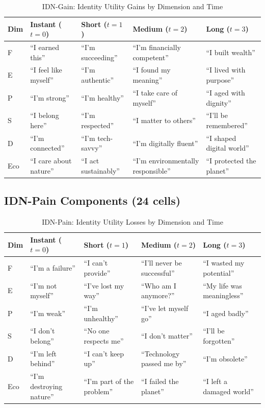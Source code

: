 \begin{table}[htbp]
\centering
\caption{IDN-Gain: Identity Utility Gains by Dimension and Time}
\label{tab:app-c-idn-gain}
\small
\renewcommand{\arraystretch}{1.2}
\begin{tabular}{@{}lp{2.8cm}p{2.8cm}p{2.8cm}p{2.8cm}@{}}
\toprule
\textbf{Dim} & \textbf{Instant ($t=0$)} & \textbf{Short ($t=1$)} & \textbf{Medium ($t=2$)} & \textbf{Long ($t=3$)} \\
\midrule
F & ``I earned this'' & ``I'm succeeding'' & ``I'm financially competent'' & ``I built wealth'' \\
E & ``I feel like myself'' & ``I'm authentic'' & ``I found my meaning'' & ``I lived with purpose'' \\
P & ``I'm strong'' & ``I'm healthy'' & ``I take care of myself'' & ``I aged with dignity'' \\
S & ``I belong here'' & ``I'm respected'' & ``I matter to others'' & ``I'll be remembered'' \\
D & ``I'm connected'' & ``I'm tech-savvy'' & ``I'm digitally fluent'' & ``I shaped digital world'' \\
Eco & ``I care about nature'' & ``I act sustainably'' & ``I'm environmentally responsible'' & ``I protected the planet'' \\
\bottomrule
\end{tabular}
\end{table}

\subsection{IDN-Pain Components (24 cells)}

\begin{table}[htbp]
\centering
\caption{IDN-Pain: Identity Utility Losses by Dimension and Time}
\label{tab:app-c-idn-pain}
\small
\renewcommand{\arraystretch}{1.2}
\begin{tabular}{@{}lp{2.8cm}p{2.8cm}p{2.8cm}p{2.8cm}@{}}
\toprule
\textbf{Dim} & \textbf{Instant ($t=0$)} & \textbf{Short ($t=1$)} & \textbf{Medium ($t=2$)} & \textbf{Long ($t=3$)} \\
\midrule
F & ``I'm a failure'' & ``I can't provide'' & ``I'll never be successful'' & ``I wasted my potential'' \\
E & ``I'm not myself'' & ``I've lost my way'' & ``Who am I anymore?'' & ``My life was meaningless'' \\
P & ``I'm weak'' & ``I'm unhealthy'' & ``I've let myself go'' & ``I aged badly'' \\
S & ``I don't belong'' & ``No one respects me'' & ``I don't matter'' & ``I'll be forgotten'' \\
D & ``I'm left behind'' & ``I can't keep up'' & ``Technology passed me by'' & ``I'm obsolete'' \\
Eco & ``I'm destroying nature'' & ``I'm part of the problem'' & ``I failed the planet'' & ``I left a damaged world'' \\
\bottomrule
\end{tabular}
\end{table}

